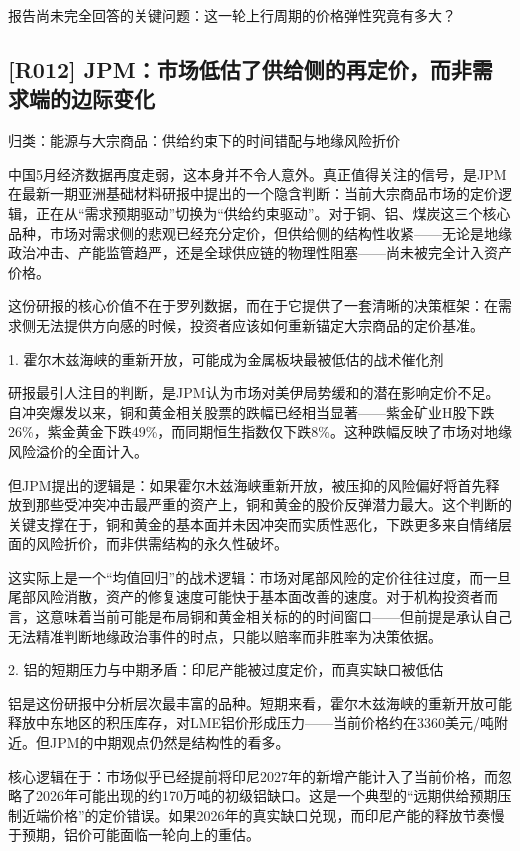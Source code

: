 \documentclass[11pt]{ctexart}
\begin{document}
报告尚未完全回答的关键问题：这一轮上行周期的价格弹性究竟有多大？

\subsection{[R012] JPM：市场低估了供给侧的再定价，而非需求端的边际变化}
{\small\color{refgray}归类：能源与大宗商品：供给约束下的时间错配与地缘风险折价}

中国5月经济数据再度走弱，这本身并不令人意外。真正值得关注的信号，是JPM在最新一期亚洲基础材料研报中提出的一个隐含判断：当前大宗商品市场的定价逻辑，正在从“需求预期驱动”切换为“供给约束驱动”。对于铜、铝、煤炭这三个核心品种，市场对需求侧的悲观已经充分定价，但供给侧的结构性收紧——无论是地缘政治冲击、产能监管趋严，还是全球供应链的物理性阻塞——尚未被完全计入资产价格。

这份研报的核心价值不在于罗列数据，而在于它提供了一套清晰的决策框架：在需求侧无法提供方向感的时候，投资者应该如何重新锚定大宗商品的定价基准。

1. 霍尔木兹海峡的重新开放，可能成为金属板块最被低估的战术催化剂

研报最引人注目的判断，是JPM认为市场对美伊局势缓和的潜在影响定价不足。自冲突爆发以来，铜和黄金相关股票的跌幅已经相当显著——紫金矿业H股下跌26\%，紫金黄金下跌49\%，而同期恒生指数仅下跌8\%。这种跌幅反映了市场对地缘风险溢价的全面计入。

但JPM提出的逻辑是：如果霍尔木兹海峡重新开放，被压抑的风险偏好将首先释放到那些受冲突冲击最严重的资产上，铜和黄金的股价反弹潜力最大。这个判断的关键支撑在于，铜和黄金的基本面并未因冲突而实质性恶化，下跌更多来自情绪层面的风险折价，而非供需结构的永久性破坏。

这实际上是一个“均值回归”的战术逻辑：市场对尾部风险的定价往往过度，而一旦尾部风险消散，资产的修复速度可能快于基本面改善的速度。对于机构投资者而言，这意味着当前可能是布局铜和黄金相关标的的时间窗口——但前提是承认自己无法精准判断地缘政治事件的时点，只能以赔率而非胜率为决策依据。

2. 铝的短期压力与中期矛盾：印尼产能被过度定价，而真实缺口被低估

铝是这份研报中分析层次最丰富的品种。短期来看，霍尔木兹海峡的重新开放可能释放中东地区的积压库存，对LME铝价形成压力——当前价格约在3360美元/吨附近。但JPM的中期观点仍然是结构性的看多。

核心逻辑在于：市场似乎已经提前将印尼2027年的新增产能计入了当前价格，而忽略了2026年可能出现的约170万吨的初级铝缺口。这是一个典型的“远期供给预期压制近端价格”的定价错误。如果2026年的真实缺口兑现，而印尼产能的释放节奏慢于预期，铝价可能面临一轮向上的重估。
\end{document}
